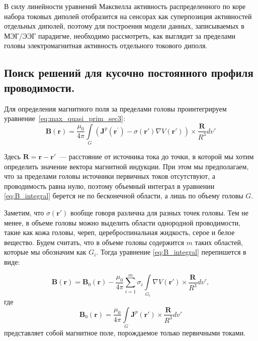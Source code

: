 В силу линейности уравнений Максвелла активность распределенного по коре набора
токовых диполей отобразится на сенсорах как суперпозиция активностей отдельных
диполей, поэтому для построения модели данных, записываемых в МЭГ/ЭЭГ
парадигме, необходимо рассмотреть, как выглядит за пределами головы
электромагнитная активность отдельного токового диполя.

\subsection{Поиск решений для кусочно постоянного профиля проводимости.}
Для определения магнитного поля за пределами головы проинтегрируем уравнение~\ref{eq:max_quasi_prim_sec3}:
\begin{equation}
    \mathbf{B}(\mathbf{r}) = \frac{\mu_0}{4\pi}\int \limits_{G} (\mathbf{J}^p(\mathbf{r}^\prime) -
    \sigma(\mathbf{r}') \nabla V(\mathbf{r}')) \times \frac{\mathbf{R}}{R^3} dv'
    \label{eq:B_integral}
\end{equation}

Здесь $\mathbf{R} = \mathbf{r} - \mathbf{r}'$~--- расстояние от источника тока до точки,
в которой мы хотим определить значение вектора магнитной индукции.
При этом мы предполагаем, что за пределами головы источники первичных токов отсутствуют,
а проводимость равна нулю, поэтому объемный интеграл в уравнении \ref{eq:B_integral}
берется не по бесконечной области, а лишь по объему головы $G$.

Заметим, что $\sigma(\mathbf{r}')$ вообще говоря различна для разных точек головы.
Тем не менее, в объеме головы можно выделить области однородной проводимости, такие как
кожа головы, череп, цереброспинальная жидкость, серое и белое вещество.
Будем считать, что в объеме головы содержится $m$ таких областей, которые мы обозначим как $G_i$.
Тогда уравнение \ref{eq:B_integral} перепишется в виде:

\begin{equation}
    \mathbf{B}(\mathbf{r}) = \mathbf{B}_0(\mathbf{r}) -
\frac{\mu_0}{4\pi}\sum_{i=1}^{m}\sigma_i \int \limits_{G_i} \nabla V(\mathbf{r}')
\times \frac{\mathbf{R}}{R^3} dv',
    \label{eq:B_integral_1}
\end{equation}
где
\begin{equation}
    \mathbf{B}_0(\mathbf{r}) =
    \frac{\mu_0}{4\pi}\int \limits_{G} \mathbf{J}^p(\mathbf{r}') \times \frac{\mathbf{R}}{R^3} dv'
    \label{eq:B_0_def}
\end{equation}
представляет собой магнитное поле, порождаемое только первичными токами.

